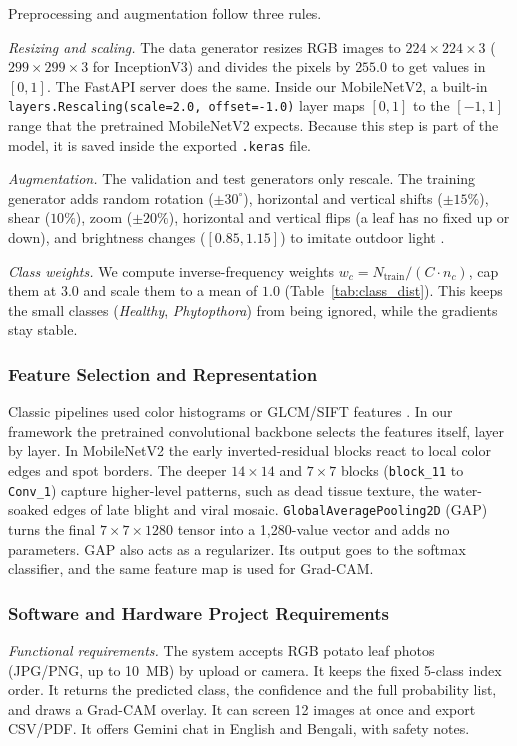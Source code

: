 Preprocessing and augmentation follow three rules.

\textit{Resizing and scaling.} The data generator resizes RGB images to $224 \times 224 \times 3$ ($299 \times 299 \times 3$ for InceptionV3) and divides the pixels by $255.0$ to get values in $[0, 1]$. The FastAPI server does the same. Inside our MobileNetV2, a built-in \texttt{layers.Rescaling(scale=2.0, offset=-1.0)} layer maps $[0, 1]$ to the $[-1, 1]$ range that the pretrained MobileNetV2 expects. Because this step is part of the model, it is saved inside the exported \texttt{.keras} file.

\textit{Augmentation.} The validation and test generators only rescale. The training generator adds random rotation ($\pm 30^\circ$), horizontal and vertical shifts ($\pm 15\%$), shear ($10\%$), zoom ($\pm 20\%$), horizontal and vertical flips (a leaf has no fixed up or down), and brightness changes ($[0.85, 1.15]$) to imitate outdoor light \cite{shorten2019survey}.

\textit{Class weights.} We compute inverse-frequency weights $w_c = N_{\text{train}} / (C \cdot n_c)$, cap them at $3.0$ and scale them to a mean of $1.0$ (Table~\ref{tab:class_dist}). This keeps the small classes (\textit{Healthy}, \textit{Phytopthora}) from being ignored, while the gradients stay stable.

\subsubsection{Feature Selection and Representation}
Classic pipelines used color histograms or GLCM/SIFT features \cite{alhiary2011fast, arivazhagan2013detection}. In our framework the pretrained convolutional backbone selects the features itself, layer by layer. In MobileNetV2 the early inverted-residual blocks react to local color edges and spot borders. The deeper $14 \times 14$ and $7 \times 7$ blocks (\texttt{block\_11} to \texttt{Conv\_1}) capture higher-level patterns, such as dead tissue texture, the water-soaked edges of late blight and viral mosaic. \texttt{GlobalAveragePooling2D} (GAP) turns the final $7 \times 7 \times 1280$ tensor into a 1,280-value vector and adds no parameters. GAP also acts as a regularizer. Its output goes to the softmax classifier, and the same feature map is used for Grad-CAM.

\subsubsection{Software and Hardware Project Requirements}
\textit{Functional requirements.} The system accepts RGB potato leaf photos (JPG/PNG, up to 10~MB) by upload or camera. It keeps the fixed 5-class index order. It returns the predicted class, the confidence and the full probability list, and draws a Grad-CAM overlay. It can screen 12 images at once and export CSV/PDF. It offers Gemini chat in English and Bengali, with safety notes.


